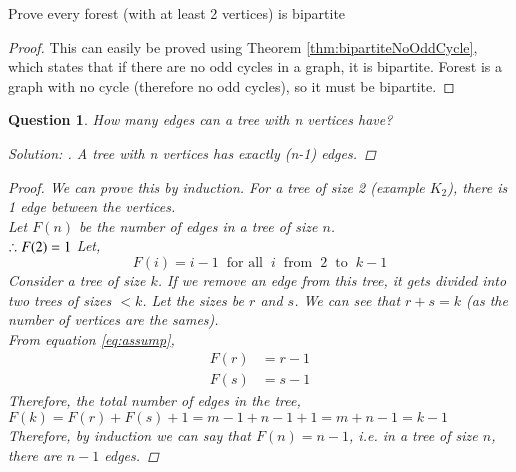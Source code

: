 \documentclass{article}
\newtheorem{question}{Question}
\begin{document}
\begin{theorem}
    Prove every forest (with at least 2 vertices) is bipartite
    \begin{proof}
        This can easily be proved using Theorem \ref{thm:bipartiteNoOddCycle}, which states that if there are no odd cycles in a graph, it is bipartite. Forest is a graph with no cycle (therefore no odd cycles), so it must be bipartite.
    \end{proof}
\end{theorem}

\begin{question}
    How many edges can a tree with n vertices have?
    \begin{proof}[Solution: ]\let\qed\relax
        A tree with n vertices has exactly (n-1) edges.       
    \end{proof}
    \begin{proof}
        We can prove this by induction. For a tree of size 2 (example $K_{2}$), there is 1 edge between the vertices.\\
        Let $F(n)$ be the number of edges in a tree of size $n$.\\
        $\therefore F(2) = 1\\$
        Let,\\
        \begin{equation}
            \label{eq:assump}
            F(i) = i-1 \phantom{x}\text{for all}\phantom{x} i\phantom{x} \text{from}\phantom{x} 2\phantom{x} \text{to}\phantom{x} k-1
        \end{equation}
        Consider a tree of size $k$. If we remove an edge from this tree, it gets divided into two trees of sizes $<k$. Let the sizes be $r$ and $s$. We can see that $r+s = k$ (as the number of vertices are the sames).\\
        From equation \ref{eq:assump},
        \begin{align*}
            F(r) &= r-1\\
            F(s) &= s-1
        \end{align*}
        Therefore, the total number of edges in the tree, $F(k) = F(r) + F(s) + 1 = m - 1 + n - 1 + 1 = m + n - 1 = k-1$\\
        Therefore, by induction we can say that $F(n)=n-1$, i.e. in a tree of size $n$, there are $n-1$ edges.
    \end{proof}
\end{question}
\end{document}

